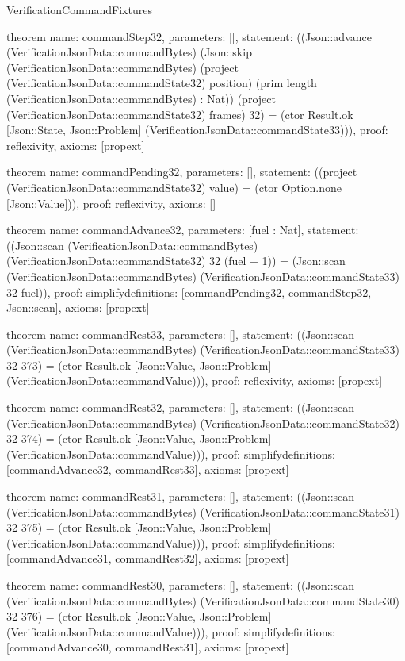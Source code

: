 \begin{lexlean}{VerificationCommandFixtures}
\begin{semanticmodule}
theorem{
  name: commandStep32,
  parameters: [],
  statement: ((Json::advance (VerificationJsonData::commandBytes) (Json::skip (VerificationJsonData::commandBytes) (project (VerificationJsonData::commandState32) position) (prim length (VerificationJsonData::commandBytes) : Nat)) (project (VerificationJsonData::commandState32) frames) 32) = (ctor Result.ok [Json::State, Json::Problem] (VerificationJsonData::commandState33))),
  proof: reflexivity{},
  axioms: [propext]
}

theorem{
  name: commandPending32,
  parameters: [],
  statement: ((project (VerificationJsonData::commandState32) value) = (ctor Option.none [Json::Value])),
  proof: reflexivity{},
  axioms: []
}

theorem{
  name: commandAdvance32,
  parameters: [fuel : Nat],
  statement: ((Json::scan (VerificationJsonData::commandBytes) (VerificationJsonData::commandState32) 32 (fuel + 1)) = (Json::scan (VerificationJsonData::commandBytes) (VerificationJsonData::commandState33) 32 fuel)),
  proof: simplify{definitions: [commandPending32, commandStep32, Json::scan]},
  axioms: [propext]
}

theorem{
  name: commandRest33,
  parameters: [],
  statement: ((Json::scan (VerificationJsonData::commandBytes) (VerificationJsonData::commandState33) 32 373) = (ctor Result.ok [Json::Value, Json::Problem] (VerificationJsonData::commandValue))),
  proof: reflexivity{},
  axioms: [propext]
}

theorem{
  name: commandRest32,
  parameters: [],
  statement: ((Json::scan (VerificationJsonData::commandBytes) (VerificationJsonData::commandState32) 32 374) = (ctor Result.ok [Json::Value, Json::Problem] (VerificationJsonData::commandValue))),
  proof: simplify{definitions: [commandAdvance32, commandRest33]},
  axioms: [propext]
}

theorem{
  name: commandRest31,
  parameters: [],
  statement: ((Json::scan (VerificationJsonData::commandBytes) (VerificationJsonData::commandState31) 32 375) = (ctor Result.ok [Json::Value, Json::Problem] (VerificationJsonData::commandValue))),
  proof: simplify{definitions: [commandAdvance31, commandRest32]},
  axioms: [propext]
}

theorem{
  name: commandRest30,
  parameters: [],
  statement: ((Json::scan (VerificationJsonData::commandBytes) (VerificationJsonData::commandState30) 32 376) = (ctor Result.ok [Json::Value, Json::Problem] (VerificationJsonData::commandValue))),
  proof: simplify{definitions: [commandAdvance30, commandRest31]},
  axioms: [propext]
}


\end{semanticmodule}
\end{lexlean}
